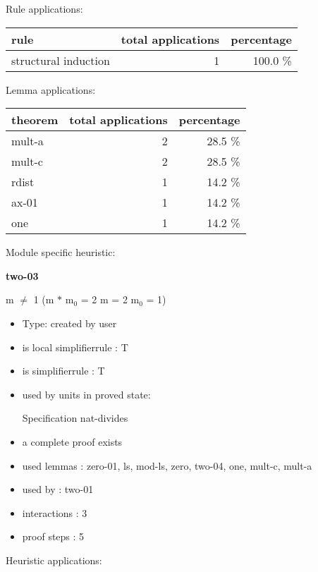 \documentclass[a4paper]{article}
\begin{document}
Rule applications:

\begin{supertabular}{l|r|r}
rule	        & total applications & percentage \\ \hline
structural induction & 1 & 100.0 \% \\

\end{supertabular}

Lemma applications:

\begin{supertabular}{l|r|r}
theorem	        & total applications & percentage \\ \hline
mult-a & 2 & 28.5 \% \\
mult-c & 2 & 28.5 \% \\
rdist & 1 & 14.2 \% \\
ax-01 & 1 & 14.2 \% \\
one & 1 & 14.2 \% \\

\end{supertabular}

Module specific heuristic:

\pagebreak

{\LARGE\bf two-03}\label{lemma-two-03}

\medskip

 \Fol m $\neq$ 1 \Imp (m $*$ $\mbox{m}_{0}$ = 2 \Equiv m = 2 \And $\mbox{m}_{0}$ = 1)

\begin{itemize}

\item Type: created by user

\item is local simplifierrule : T
\item is simplifierrule : T
\item used by units in proved state:

Specification nat-divides
\item       a complete proof exists
\item       used lemmas  : zero-01, ls, mod-ls, zero, two-04, one, mult-c, mult-a
\item       used by      : two-01
\item       interactions : 3
\item       proof steps  : 5
\end{itemize}

\medskip


Heuristic applications:
\end{document}

